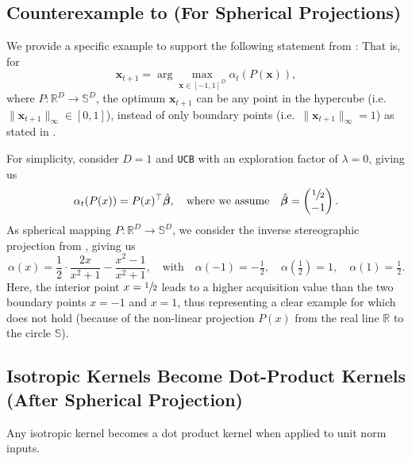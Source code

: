 \documentclass[twoside]{article}
\theoremstyle{plain}
\theoremstyle{definition}
\begin{document}
\subsection{Counterexample to  (For Spherical Projections)} \label{app:no-boundary} 
We provide a specific example to support the following statement from :  That is, for
\begin{equation*}
    \mathbf{x}_{t+1} = \arg \max_{\mathbf{x} \in [-1, 1]^D} \alpha_t\left(P(\mathbf{x})\right),
\end{equation*}
where $P: \mathbb{R}^D \rightarrow \mathbb{S}^D$, the optimum $\mathbf{x}_{t+1}$ can be any point in the hypercube (i.e.\ $\|\mathbf{x}_{t+1}\|_\infty \in [0,1]$), instead of only boundary points (i.e.\ $\|\mathbf{x}_{t+1}\|_\infty = 1$) as stated in .

For simplicity, consider $D=1$ and \texttt{UCB} with an exploration factor of $\lambda = 0$, giving us
\begin{equation*}
    \alpha_t(P(x)) = P(x)^\top \hat{\bm{\beta}}, \quad \text{where we assume} \quad \hat{\bm{\beta}} =  \begin{pmatrix}
        \sfrac{1}{2} \\
        -1
    \end{pmatrix}.
\end{equation*}
As spherical mapping $P: \mathbb{R}^D \rightarrow \mathbb{S}^D$, we consider the inverse stereographic projection from , giving us 
\begin{equation*}
    \alpha(x) = \dfrac{1}{2} \cdot \dfrac{2x}{x^2+1} - \dfrac{x^2-1}{x^2+1}, \quad \text{with} \quad \alpha(-1) = -\tfrac{1}{2}, \quad \alpha\left(\tfrac{1}{2}\right) =1, \quad \alpha(1) =\tfrac{1}{2}.
\end{equation*}
Here, the interior point $x=\sfrac{1}{2}$ leads to a higher acquisition value than the two boundary points $x = -1$ and $x=1$, thus representing a clear example for which  does not hold (because of the non-linear projection $P(x)$ from the real line $\mathbb{R}$ to the circle $\mathbb{S}$).

\subsection{Isotropic Kernels Become Dot-Product Kernels (After Spherical Projection)} \label{app:isotropic-dot-product}
Any isotropic kernel becomes a dot product kernel when applied to unit norm inputs.
\end{document}
